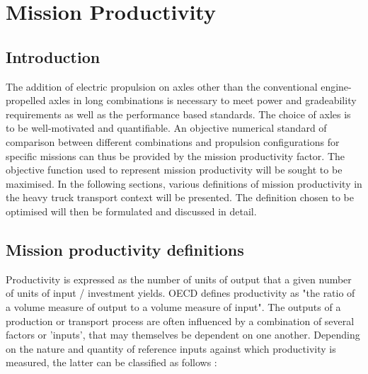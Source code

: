 \documentclass[ExampleMasters.tex]{subfiles}
\begin{document}
\chapter{Mission Productivity}

	\section{Introduction}
		The addition of electric propulsion on axles other than the conventional engine-propelled axles in long combinations is necessary to meet power and gradeability requirements as well as the performance based standards. The choice of axles is to be well-motivated and quantifiable. An objective numerical standard of comparison between different combinations and propulsion configurations for specific missions can thus be provided by the mission productivity factor. The objective function used to represent mission productivity will be sought to be maximised. In the following sections, various definitions of mission productivity in the heavy truck transport context will be presented. The definition chosen to be optimised will then be formulated and discussed in detail. 

	\section{Mission productivity definitions}
		Productivity is expressed as the number of units of output that a given number of units of input / investment yields. OECD defines productivity as "the ratio of a volume measure of output to a volume measure of input"\cite{OECDProd}. The outputs of a production or transport process are often influenced by a combination of several factors or 'inputs', that may themselves be dependent on one another. Depending on the nature and quantity of reference inputs against which productivity is measured, the latter can be classified as follows \cite{JapSNAOECD}:
\end{document}
